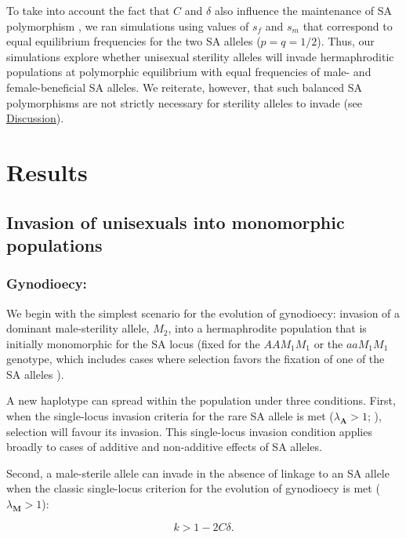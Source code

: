 \documentclass{article}
\newcommand\hl[1]{%
  \bgroup
  \hskip0pt\color{blue!80!black}%
  #1%
  \egroup
}
\begin{document}
To \hl{take into account} the fact that $C$ and $\delta$ also influence the maintenance of SA polymorphism \citep{JordanConnallon2014,Olito2017}, we ran simulations using values of $s_f$ and $s_m$ that correspond to equal equilibrium frequencies for the two SA alleles ($p = q = 1/2$). Thus, our simulations explore whether unisexual sterility alleles will invade hermaphroditic populations at polymorphic equilibrium with equal frequencies of male- and female-beneficial SA alleles. \hl{We reiterate, however, that such balanced SA polymorphisms are not strictly necessary for sterility alleles to invade} (see \hyperref[sec:Discussion]{Discussion}).


\section*{Results}

\subsection*{Invasion of unisexuals into monomorphic populations}

\subsubsection*{Gynodioecy:} We begin with the simplest scenario for the evolution of gynodioecy: invasion of a dominant male-sterility allele, $M_2$, into a hermaphrodite population that is initially monomorphic for the SA locus (fixed for the $AAM_1M_1$ or the $aaM_1M_1$ genotype, \hl{which includes cases where selection favors the fixation of one of the SA alleles}).  

\hl{A new haplotype can spread within the population under three conditions. First, when the single-locus invasion criteria for the rare SA allele is met ($\lambda_{\mathbf{A}} > 1$;} \citealt{Kidwell1977, JordanConnallon2014, Olito2017}), \hl{selection will favour its invasion. This single-locus invasion condition applies broadly to cases of additive and non-additive effects of SA alleles.} 

Second, a male-sterile allele can invade in the absence of linkage to an SA allele when the classic single-locus criterion for the evolution of gynodioecy is met ($\lambda_{\mathbf{M}} > 1$):

\begin{equation}\label{eq:1LocGyn}
	k > 1 - 2 C \delta.
\end{equation}
\end{document}
